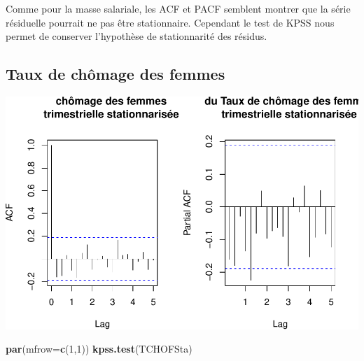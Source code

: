 \documentclass[11pt,]{article}
\newenvironment{Shaded}{\begin{snugshade}}{\end{snugshade}}
\newcommand{\KeywordTok}[1]{\textcolor[rgb]{0.13,0.29,0.53}{\textbf{{#1}}}}
\newcommand{\DataTypeTok}[1]{\textcolor[rgb]{0.13,0.29,0.53}{{#1}}}
\newcommand{\DecValTok}[1]{\textcolor[rgb]{0.00,0.00,0.81}{{#1}}}
\newcommand{\StringTok}[1]{\textcolor[rgb]{0.31,0.60,0.02}{{#1}}}
\newcommand{\NormalTok}[1]{{#1}}
\begin{document}
Comme pour la masse salariale, les ACF et PACF semblent montrer que la
série résiduelle pourrait ne pas être stationnaire. Cependant le test de
KPSS nous permet de conserver l'hypothèse de stationnarité des résidus.

\subsection{Taux de chômage des
femmes}\label{taux-de-chomage-des-femmes-1}

\begin{Shaded}
\end{Shaded}

\includegraphics{doc_files/figure-latex/unnamed-chunk-9-1.pdf}

\begin{Shaded}
\begin{Highlighting}[]
  \KeywordTok{par}\NormalTok{(}\DataTypeTok{mfrow=}\KeywordTok{c}\NormalTok{(}\DecValTok{1}\NormalTok{,}\DecValTok{1}\NormalTok{))}
  \KeywordTok{kpss.test}\NormalTok{(TCHOFSta)}
\end{Highlighting}
\end{Shaded}
\end{document}
